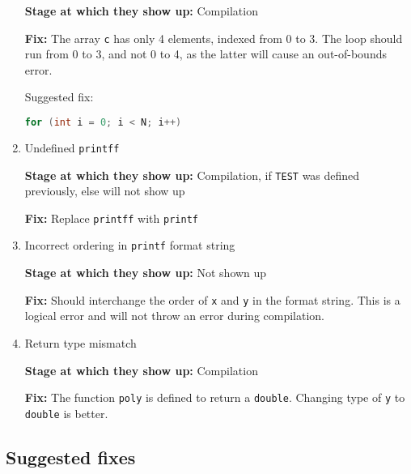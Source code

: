 \begin{enumerate}
            \textbf{Stage at which they show up:}
            Compilation

            \textbf{Fix:}
            The array \texttt{c} has only 4 elements, indexed from 0 to 3.
            The loop should run from 0 to 3, and not 0 to 4, as the latter will cause an out-of-bounds error.

            Suggested fix:
            \begin{lstlisting}[language=C, frame=single]
for (int i = 0; i < N; i++)
            \end{lstlisting}

      \item Undefined \texttt{printff}

            \textbf{Stage at which they show up:}
            Compilation, if \texttt{TEST} was defined previously, else will not show up

            \textbf{Fix:}
            Replace \texttt{printff} with \texttt{printf}

      \item Incorrect ordering in \texttt{printf} format string

            \textbf{Stage at which they show up:}
            Not shown up

            \textbf{Fix:}
            Should interchange the order of \texttt{x} and \texttt{y} in the format string.
            This is a logical error and will not throw an error during compilation.

      \item Return type mismatch

            \textbf{Stage at which they show up:}
            Compilation

            \textbf{Fix:}
            The function \texttt{poly} is defined to return a \texttt{double}.
            Changing type of \texttt{y}  to \texttt{double} is better.

\end{enumerate}

\clearpage
\subsection*{Suggested fixes}


